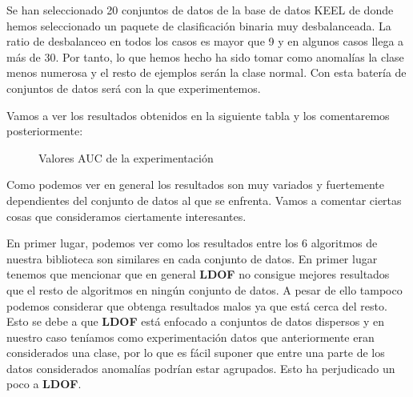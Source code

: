 Se han seleccionado 20 conjuntos de datos de la base de datos KEEL \cite{alcala-fdezKEELSoftwareTool2009} 
de donde hemos seleccionado un paquete de clasificación binaria muy desbalanceada. La ratio de  
desbalanceo en todos los casos es mayor que 9 y en algunos casos llega a más de 30. Por tanto, 
lo que hemos hecho ha sido tomar como anomalías la clase menos numerosa y el resto de ejemplos 
serán la clase normal. Con esta batería de conjuntos de datos será con la que experimentemos. 

Vamos a ver los resultados obtenidos en la siguiente tabla y los comentaremos posteriormente:

\begin{figure}[h]
  \caption{\label{fig:resultados} Valores AUC de la experimentación}
\end{figure}

Como podemos ver en general los resultados son muy variados y fuertemente dependientes del conjunto
de datos al que se enfrenta. Vamos a comentar ciertas cosas que consideramos ciertamente 
interesantes.

En primer lugar, podemos ver como los resultados entre los 6 algoritmos de nuestra biblioteca
 son similares en cada conjunto de 
datos. En primer lugar tenemos que mencionar que en general \textbf{LDOF} no consigue mejores  
resultados que el resto de algoritmos en ningún conjunto de datos. A pesar de ello tampoco podemos 
considerar que obtenga resultados malos ya que está cerca del resto. Esto se debe a que  
\textbf{LDOF} está enfocado a conjuntos de datos dispersos y en nuestro caso teníamos como 
experimentación datos que anteriormente eran considerados una clase, por lo que es fácil suponer 
que entre una parte de los datos considerados anomalías podrían estar agrupados. Esto ha perjudicado 
un poco a \textbf{LDOF}. 

